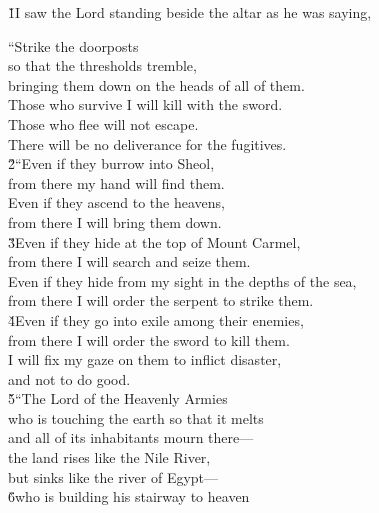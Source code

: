 \v{1}I saw the Lord standing beside the altar as he was saying,

\begin{poetry}
\poeml ``Strike the doorposts \\
\poemll    so that the thresholds tremble, \\
\poemlll       bringing them down on the heads of all of them. \\
\poeml Those who survive I will kill with the sword. \\
\poemll    Those who flee will not escape. \\
\poemlll       There will be no deliverance for the fugitives. \\
\poeml \v{2}``Even if they burrow into Sheol, \\
\poemll    from there my hand will find them. \\
\poeml Even if they ascend to the heavens, \\
\poemll    from there I will bring them down. \\
\poeml \v{3}Even if they hide at the top of Mount Carmel, \\
\poemll    from there I will search and seize them. \\
\poeml Even if they hide from my sight in the depths of the sea, \\
\poemll    from there I will order the serpent to strike them. \\
\poeml \v{4}Even if they go into exile among their enemies, \\
\poemll    from there I will order the sword to kill them. \\
\poeml I will fix my gaze on them to inflict disaster, \\
\poemll    and not to do good. \\
\poeml \v{5}``The Lord  of the Heavenly Armies \\
\poeml who is touching the earth so that it melts \\
\poemll    and all of its inhabitants mourn there--- \\
\poemlll       the land rises like the Nile River, \\
\poemlll       but sinks like the river of Egypt--- \\
\poeml \v{6}who is building his stairway to heaven \\

\end{poetry}
